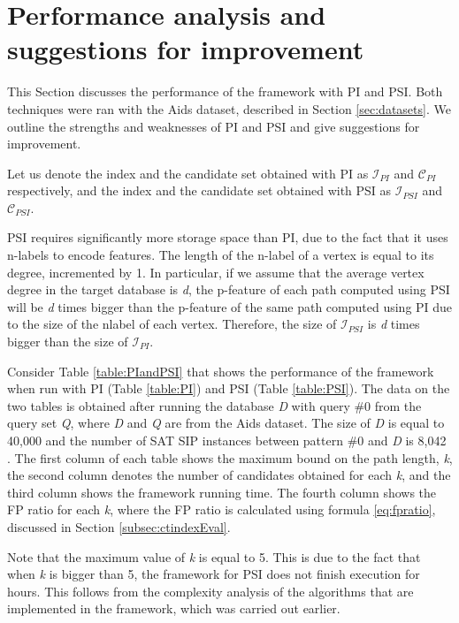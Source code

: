 \documentclass{l4proj}
\newcommand{\fancyI}{\mathcal{I}}
\newcommand{\fancyC}{\mathcal{C}}
\begin{document}
\section{Performance analysis and suggestions for improvement}
\label{sec:performance}
This Section discusses the performance of the framework with PI and PSI. Both techniques were ran with the Aids dataset, described in Section \ref{sec:datasets}. We outline the strengths and weaknesses of PI and PSI and give suggestions for improvement.

Let us denote the index and the candidate set obtained with PI as $\fancyI_{PI}$ and $\fancyC_{PI}$ respectively, and the index and the candidate set obtained with PSI as $\fancyI_{PSI}$ and $\fancyC_{PSI}$. 

PSI requires significantly more storage space than PI, due to the fact that it uses n-labels to encode features. The length of the n-label of a vertex is equal to its degree, incremented by 1. In particular, if we assume that the average vertex degree in the target database is \emph{d}, the p-feature of each path computed using PSI will be \emph{d} times bigger than the p-feature of the same path computed using PI due to the size of the nlabel of each vertex. Therefore, the size of $\fancyI_{PSI}$ is \emph{d} times bigger than the size of $\fancyI_{PI}$.

Consider Table \ref{table:PIandPSI} that shows the performance of the framework when run with PI (Table \ref{table:PI}) and PSI (Table \ref{table:PSI}). The data on the two tables is obtained after running the database \emph{D} with query \#0 from the query set \emph{Q}, where \emph{D} and \emph{Q} are from the Aids dataset. The size of \emph{D} is equal to 40,000 and the number of SAT SIP instances between pattern \#0 and \emph{D} is 8,042 \cite{datasets}. The first column of each table shows the maximum bound on the path length, \emph{k}, the second column denotes the number of candidates obtained for each \emph{k}, and the third column shows the framework running time. The fourth column shows the FP ratio for each \emph{k}, where the FP ratio is calculated using formula \ref{eq:fpratio}, discussed in Section \ref{subsec:ctindexEval}.

Note that the maximum value of \emph{k} is equal to 5. This is due to the fact that when \emph{k} is bigger than 5, the framework for PSI does not finish execution for hours. This follows from the complexity analysis of the algorithms that are implemented in the framework, which was carried out earlier. 
\end{document}
